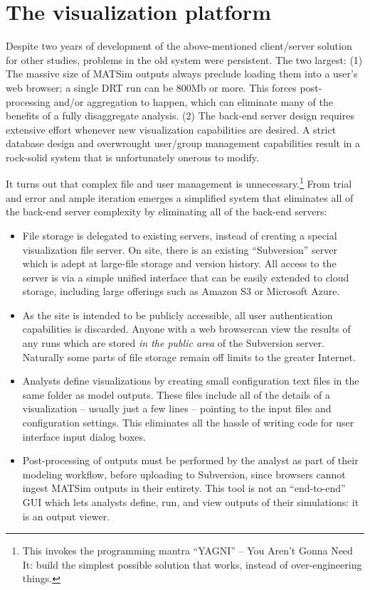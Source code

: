 \section{The visualization platform}
\label{avov-platform}

Despite two years of development of the above-mentioned client/server solution for other studies, problems in the old system were persistent. The two largest: (1) The massive size of MATSim outputs always preclude loading them into a user's web browser; a single DRT run can be 800Mb or more. This forces post-processing and/or aggregation to happen, which can eliminate many of the benefits of a fully disaggregate analysis. (2) The back-end server design requires extensive effort whenever new visualization capabilities are desired. A strict database design and overwrought user/group management capabilities result in a rock-solid system that is unfortunately onerous to modify.

It turns out that complex file and user management is unnecessary.\footnote{This invokes the programming mantra ``YAGNI'' -- You Aren't Gonna Need It: build the simplest possible solution that works, instead of over-engineering things.} From trial and error and ample iteration emerges a simplified system that eliminates all of the back-end server complexity by eliminating all of the back-end servers:

\begin{itemize}
  \item File storage is delegated to existing servers, instead of creating a special visualization file server. On site, there is an existing ``Subversion'' server \cite{Fitzpatrick2004Subversion} which is adept at large-file storage and version history. All access to the server is via a simple unified interface that can be easily extended to cloud storage, including large offerings such as Amazon S3 or Microsoft Azure.

  \item As the site is intended to be publicly accessible, all user authentication capabilities is discarded. Anyone with a web browsercan view the results of any runs which are stored \emph{in the public area} of the Subversion server. Naturally some parts of file storage remain off limits to the greater Internet.

  \item Analysts define visualizations by creating small configuration text files in the same folder as model outputs. These files include all of the details of a visualization -- usually just a few lines -- pointing to the input files and configuration settings. This eliminates all the hassle of writing code for user interface input dialog boxes.

  \item Post-processing of outputs must be performed by the analyst as part of their modeling workflow, before uploading to Subversion, since browsers cannot ingest MATSim outputs in their entirety. This tool is not an ``end-to-end'' GUI which lets analysts define, run, and view outputs of their simulations: it is an output viewer.
\end{itemize}

